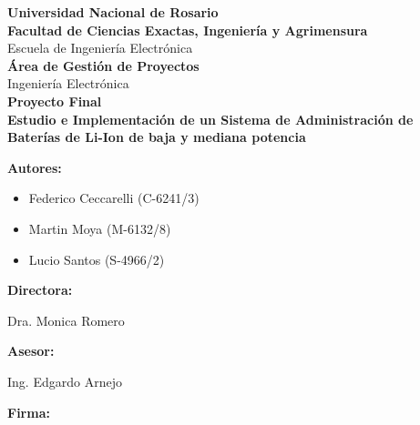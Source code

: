 \documentclass[10pt,a4paper]{article}
\begin{document}
\begin{titlepage}
\begin{center}
			\large{ \textbf{Universidad Nacional de Rosario}} \\[5mm]
			\textbf{Facultad de Ciencias Exactas, Ingeniería y Agrimensura} \\[5mm]
			Escuela de Ingeniería Electrónica \\[20mm]
			\Large {\textbf{Área de Gestión de Proyectos}}\\[1.5mm]
			\small {Ingeniería Electrónica} \\[20mm]
			\Large {\textbf{Proyecto Final}} \\[5mm]
			\Large {\textbf{Estudio e Implementación de un Sistema de 
                            Administración de Baterías de Li-Ion de baja y 
                            mediana potencia}} \\[15mm]
			
		\end{center}
		\begin{minipage}[t]{0.5\textwidth}
			{\large\textbf{Autores:}}
			\begin{itemize}
				\item Federico Ceccarelli (C-6241/3)
				\item Martin Moya (M-6132/8)
				\item Lucio Santos (S-4966/2)
			\end{itemize}
			\vspace{10pt}
			{\large\textbf{Directora:}}

			
			Dra. Monica Romero
			
			{\large\textbf{Asesor:}}

			
			Ing. Edgardo Arnejo
			
		\end{minipage}
		\begin{minipage}[t]{0.5\textwidth}
			\Large\textbf{Firma:}
		\end{minipage}
		
		
	\end{titlepage}
	
    
    \clearpage
    
\end{document}
